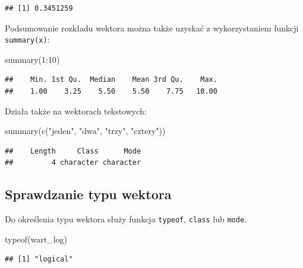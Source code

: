 \documentclass[
]{book}
\newenvironment{Shaded}{\begin{snugshade}}{\end{snugshade}}
\newcommand{\DecValTok}[1]{\textcolor[rgb]{0.00,0.00,0.81}{#1}}
\newcommand{\FunctionTok}[1]{\textcolor[rgb]{0.00,0.00,0.00}{#1}}
\newcommand{\NormalTok}[1]{#1}
\newcommand{\SpecialCharTok}[1]{\textcolor[rgb]{0.00,0.00,0.00}{#1}}
\newcommand{\StringTok}[1]{\textcolor[rgb]{0.31,0.60,0.02}{#1}}
\begin{document}
\begin{verbatim}
## [1] 0.3451259
\end{verbatim}

Podsumowanie rozkładu wektora można także uzyskać z wykorzystaniem funkcji \texttt{summary(x)}:

\begin{Shaded}
\begin{Highlighting}[]
\FunctionTok{summary}\NormalTok{(}\DecValTok{1}\SpecialCharTok{:}\DecValTok{10}\NormalTok{)}
\end{Highlighting}
\end{Shaded}

\begin{verbatim}
##    Min. 1st Qu.  Median    Mean 3rd Qu.    Max. 
##    1.00    3.25    5.50    5.50    7.75   10.00
\end{verbatim}

Działa także na wektorach tekstowych:

\begin{Shaded}
\begin{Highlighting}[]
\FunctionTok{summary}\NormalTok{(}\FunctionTok{c}\NormalTok{(}\StringTok{"jeden"}\NormalTok{, }\StringTok{"dwa"}\NormalTok{, }\StringTok{"trzy"}\NormalTok{, }\StringTok{"cztery"}\NormalTok{))}
\end{Highlighting}
\end{Shaded}

\begin{verbatim}
##    Length     Class      Mode 
##         4 character character
\end{verbatim}

\hypertarget{sprawdzanie-typu-wektora}{%
\subsection{Sprawdzanie typu wektora}\label{sprawdzanie-typu-wektora}}

Do określenia typu wektora służy funkcja \texttt{typeof}, \texttt{class} lub \texttt{mode}.

\begin{Shaded}
\begin{Highlighting}[]
\FunctionTok{typeof}\NormalTok{(wart\_log)}
\end{Highlighting}
\end{Shaded}

\begin{verbatim}
## [1] "logical"
\end{verbatim}
\end{document}
